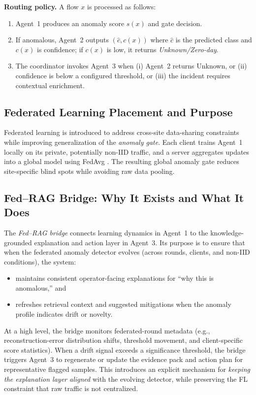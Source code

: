 \documentclass[conference]{IEEEtran}
\begin{document}
\textbf{Routing policy.} A flow $x$ is processed as follows:
\begin{enumerate}
  \item Agent~1 produces an anomaly score $s(x)$ and gate decision.
  \item If anomalous, Agent~2 outputs $(\hat{c}, c(x))$ where $\hat{c}$ is the predicted class and $c(x)$ is confidence; if $c(x)$ is low, it returns \emph{Unknown/Zero-day}.
  \item The coordinator invokes Agent~3 when (i) Agent~2 returns Unknown, or (ii) confidence is below a configured threshold, or (iii) the incident requires contextual enrichment.
\end{enumerate}

\subsection{Federated Learning Placement and Purpose}
Federated learning is introduced to address cross-site data-sharing constraints while improving generalization of the \emph{anomaly gate}. Each client trains Agent~1 locally on its private, potentially non-IID traffic, and a server aggregates updates into a global model using FedAvg \cite{mcmahan2017fedavg,kairouz2021flsurvey}. The resulting global anomaly gate reduces site-specific blind spots while avoiding raw data pooling.

\subsection{Fed--RAG Bridge: Why It Exists and What It Does}
The \emph{Fed--RAG bridge} connects learning dynamics in Agent~1 to the knowledge-grounded explanation and action layer in Agent~3. Its purpose is to ensure that when the federated anomaly detector evolves (across rounds, clients, and non-IID conditions), the system:
\begin{itemize}
  \item maintains consistent operator-facing explanations for ``why this is anomalous,'' and
  \item refreshes retrieval context and suggested mitigations when the anomaly profile indicates drift or novelty.
\end{itemize}

At a high level, the bridge monitors federated-round metadata (e.g., reconstruction-error distribution shifts, threshold movement, and client-specific score statistics). When a drift signal exceeds a significance threshold, the bridge triggers Agent~3 to regenerate or update the evidence pack and action plan for representative flagged samples. This introduces an explicit mechanism for \emph{keeping the explanation layer aligned} with the evolving detector, while preserving the FL constraint that raw traffic is not centralized.
\end{document}

